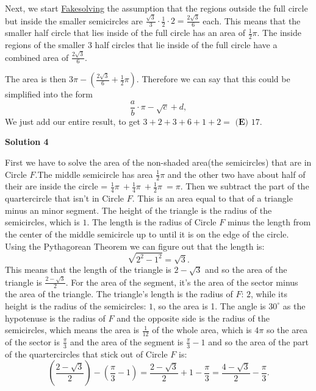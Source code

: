 \begin{enumerate}
 Next, we start \href{https://artofproblemsolving.com/wiki/index.php/Fakesolving?srsltid=AfmBOooIYJBasY2JG2w6ib8tmkZzk\_s4gHj3D43Dmllv1jje2xbw7KzG}{Fakesolving} the assumption that the regions outside the full circle but inside the smaller semicircles are \( \frac{\sqrt{3}}{3} \cdot \frac{1}{2} \cdot 2 = \frac{2\sqrt{3}}{6} \) each. This means that the smaller half circle that lies inside of the full circle has an area of \( \frac{1}{2} \pi \). The inside regions of the smaller 3 half circles that lie inside of the full circle have a combined area of \( \frac{2\sqrt{3}}{6} \). 

 The area is then \( 3\pi - (\frac{2\sqrt{3}}{6} + \frac{1}{2} \pi) \). Therefore we can say that this could be simplified into the form
 \[\frac{a}{b} \cdot \pi - \sqrt{c} + d,\]We just add our entire result, to get \( 3 + 2 + 3 + 6 + 1 + 2 = \) \(\boxed{\textbf{(E) } 17}\).

 



\textbf{Solution 4}

First we have to solve the area of the non-shaded area(the semicircles) that are in Circle $F$.The middle semicircle has area $\frac12\pi$ and the other two have about half of their are inside the circle = $\frac14\pi\ + \frac14\pi\ + \frac12\pi\ = \pi$. Then we subtract the part of the quartercircle that isn't in Circle $F$. This is an area equal to that of a triangle minus an minor segment. The height of the triangle is the radius of the semicircles, which is $1$. The length is the radius of Circle $F$ minus the length from the center of the middle semicircle up to until it is on the edge of the circle. Using the Pythagorean Theorem we can figure out that the length is: 
 \[\sqrt{2^2 - 1^2} = \sqrt{3}.\] This means that the length of the triangle is $2 - \sqrt{3}$ and so the area of the triangle is $\frac{2 - \sqrt{3}}{2}$. For the area of the segment, it's the area of the sector minus the area of the triangle. The triangle's length is the radius of $F$: $2$, while its height is the radius of the semicircles: $1$, so the area is 1. The  angle is $30^{\circ}$ as the hypotenuse is the radius of $F$ and the opposite side is the radius of the semicircles, which means the area is $\frac{1}{12}$ of the whole area, which is $4\pi$ so the area of the sector is $\frac{\pi}{3}$ and the area of the segment is $\frac{\pi}{3} - 1$ and so the area of the part of the quartercircles that stick out of Circle $F$ is: 
 \[(\frac{2 - \sqrt{3}}{2})-(\frac{\pi}{3} - 1) = \frac{2 - \sqrt{3}}{2} + 1 - \frac{\pi}{3} = \frac{4 - \sqrt{3}}{2} - \frac{\pi}{3}.\]


\end{enumerate}
